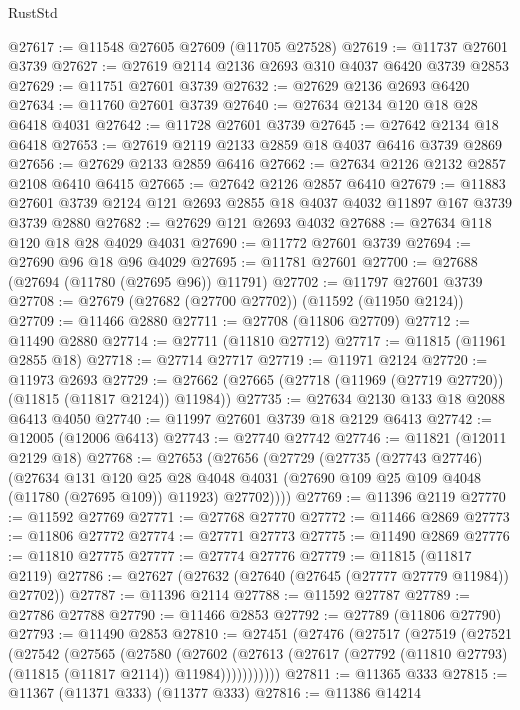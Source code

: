 \begin{lexlean}{RustStd}
\begin{coremodule}
@27617 := @11548 @27605 @27609 (@11705 @27528)
@27619 := @11737 @27601 @3739
@27627 := @27619 @2114 @2136 @2693 @310 @4037 @6420 @3739 @2853
@27629 := @11751 @27601 @3739
@27632 := @27629 @2136 @2693 @6420
@27634 := @11760 @27601 @3739
@27640 := @27634 @2134 @120 @18 @28 @6418 @4031
@27642 := @11728 @27601 @3739
@27645 := @27642 @2134 @18 @6418
@27653 := @27619 @2119 @2133 @2859 @18 @4037 @6416 @3739 @2869
@27656 := @27629 @2133 @2859 @6416
@27662 := @27634 @2126 @2132 @2857 @2108 @6410 @6415
@27665 := @27642 @2126 @2857 @6410
@27679 := @11883 @27601 @3739 @2124 @121 @2693 @2855 @18 @4037 @4032 @11897 @167 @3739 @3739 @2880
@27682 := @27629 @121 @2693 @4032
@27688 := @27634 @118 @120 @18 @28 @4029 @4031
@27690 := @11772 @27601 @3739
@27694 := @27690 @96 @18 @96 @4029
@27695 := @11781 @27601
@27700 := @27688 (@27694 (@11780 (@27695 @96)) @11791)
@27702 := @11797 @27601 @3739
@27708 := @27679 (@27682 (@27700 @27702)) (@11592 (@11950 @2124))
@27709 := @11466 @2880
@27711 := @27708 (@11806 @27709)
@27712 := @11490 @2880
@27714 := @27711 (@11810 @27712)
@27717 := @11815 (@11961 @2855 @18)
@27718 := @27714 @27717
@27719 := @11971 @2124
@27720 := @11973 @2693
@27729 := @27662 (@27665 (@27718 (@11969 (@27719 @27720)) (@11815 (@11817 @2124)) @11984))
@27735 := @27634 @2130 @133 @18 @2088 @6413 @4050
@27740 := @11997 @27601 @3739 @18 @2129 @6413
@27742 := @12005 (@12006 @6413)
@27743 := @27740 @27742
@27746 := @11821 (@12011 @2129 @18)
@27768 := @27653
    (@27656
      (@27729
        (@27735
          (@27743 @27746)
          (@27634
            @131
            @120
            @25
            @28
            @4048
            @4031
            (@27690 @109 @25 @109 @4048 (@11780 (@27695 @109)) @11923)
            @27702))))
@27769 := @11396 @2119
@27770 := @11592 @27769
@27771 := @27768 @27770
@27772 := @11466 @2869
@27773 := @11806 @27772
@27774 := @27771 @27773
@27775 := @11490 @2869
@27776 := @11810 @27775
@27777 := @27774 @27776
@27779 := @11815 (@11817 @2119)
@27786 := @27627 (@27632 (@27640 (@27645 (@27777 @27779 @11984)) @27702))
@27787 := @11396 @2114
@27788 := @11592 @27787
@27789 := @27786 @27788
@27790 := @11466 @2853
@27792 := @27789 (@11806 @27790)
@27793 := @11490 @2853
@27810 := @27451
    (@27476
      (@27517
        (@27519
          (@27521
            (@27542
              (@27565
                (@27580
                  (@27602
                    (@27613
                      (@27617 (@27792 (@11810 @27793) (@11815 (@11817 @2114)) @11984)))))))))))
@27811 := @11365 @333
@27815 := @11367 (@11371 @333) (@11377 @333)
@27816 := @11386 @14214

\end{coremodule}
\end{lexlean}
